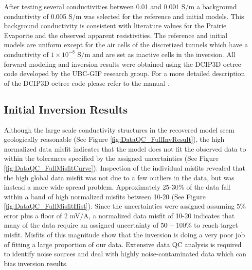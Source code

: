 \documentclass[final,authoryear,5p,times,twocolumn]{elsarticle}
\begin{document}
After testing several conductivities between 0.01 and 0.001 S/m a background conductivity of 0.005 S/m was selected for the reference and initial models. This background conductivity is consistent with literature values for the Prairie Evaporite \citep{Duckworth1992,Chouteau1997} and the observed apparent resistivities. The reference and initial models are uniform except for the air cells of the discretized tunnels which have a conductivity of $1 \times 10^{-8}$ S/m and are set as inactive cells in the inversion. All forward modeling and inversion results were obtained using the DCIP3D octree code developed by the UBC-GIF research group. For a more detailed description of the DCIP3D octree code please refer to the manual \citep{DCIP3D_Octree_Manual}.

\subsection{Initial Inversion Results}
\label{InitialInvResults}

Although the large scale conductivity structures in the recovered model seem geologically reasonable (See Figure \ref{fig:DataQC_FullInvResult}), the high normalized data misfit indicates that the model does not fit the observed data to within the tolerances specified by the assigned uncertainties (See Figure \ref{fig:DataQC_FullMisfitCurve}). Inspection of the individual misfits revealed that the high global data misfit was not due to a few outliers in the data, but was instead a more wide spread problem. Approximately 25-30$\%$ of the data fall within a band of high normalized misfits between 10-20 (See Figure \ref{fig:DataQC_FullMisfitHist}). Since the uncertainties were assigned assuming $5\%$ error plus a floor of 2 mV/A, a normalized data misfit of 10-20 indicates that many of the data require an assigned uncertainty of $50-100\%$ to reach target misfit. Misfits of this magnitude show that the inversion is doing a very poor job of fitting a large proportion of our data. Extensive data QC analysis is required to identify noise sources and deal with highly noise-contaminated data which can bias inversion results.  
\end{document}
